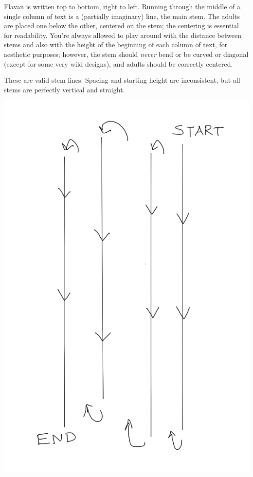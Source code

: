 \documentclass[10pt,oneside]{memoir}
\begin{document}
\begin{minipage}{0.5\textwidth}
Flavan is written top to bottom, right to left. Running through the middle of a single column of text is a (partially imaginary) line, the main stem. The adults are placed one below the other, centered on the stem; the centering is essential for readability. You're always allowed to play around with the distance between stems and also with the height of the beginning of each column of text, for aesthetic purposes; however, the stem should \emph{never} bend or be curved or diagonal (except for some very wild designs), and adults should be correctly centered. 

These are valid stem lines. Spacing and starting height are inconsistent, but all stems are perfectly vertical and straight.
\end{minipage}
\hfill
\begin{minipage}{0.45\textwidth}
    \centering
    \includegraphics{stems}
\end{minipage}
\end{document}
